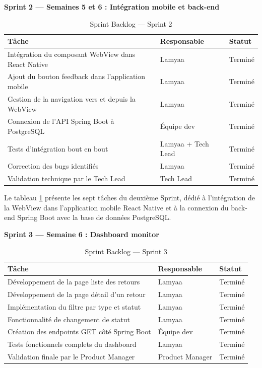 \textbf{Sprint 2 — Semaines 5 et 6 : Intégration mobile et back-end}

\begin{table}[H]
\centering
\caption{Sprint Backlog — Sprint 2}
\label{tab:sprint2}
\renewcommand{\arraystretch}{1.5}
\begin{tabular}{|p{7cm}|p{2.5cm}|p{2cm}|}
\hline
\textbf{Tâche} & \textbf{Responsable} & \textbf{Statut} \\
\hline
Intégration du composant WebView dans React Native & Lamyaa & Terminé \\
\hline
Ajout du bouton feedback dans l'application mobile & Lamyaa & Terminé \\
\hline
Gestion de la navigation vers et depuis la WebView & Lamyaa & Terminé \\
\hline
Connexion de l'API Spring Boot à PostgreSQL & Équipe dev & Terminé \\
\hline
Tests d'intégration bout en bout & Lamyaa + Tech Lead & Terminé \\
\hline
Correction des bugs identifiés & Lamyaa & Terminé \\
\hline
Validation technique par le Tech Lead & Tech Lead & Terminé \\
\hline
\end{tabular}
\end{table}

Le tableau \ref{tab:sprint2} présente les sept tâches du deuxième Sprint, 
dédié à l'intégration de la WebView dans l'application mobile React Native 
et à la connexion du back-end Spring Boot avec la base de données PostgreSQL.

\textbf{Sprint 3 — Semaine 6 : Dashboard monitor}

\begin{table}[H]
\centering
\caption{Sprint Backlog — Sprint 3}
\label{tab:sprint3}
\renewcommand{\arraystretch}{1.5}
\begin{tabular}{|p{7cm}|p{2.5cm}|p{2cm}|}
\hline
\textbf{Tâche} & \textbf{Responsable} & \textbf{Statut} \\
\hline
Développement de la page liste des retours & Lamyaa & Terminé \\
\hline
Développement de la page détail d'un retour & Lamyaa & Terminé \\
\hline
Implémentation du filtre par type et statut & Lamyaa & Terminé \\
\hline
Fonctionnalité de changement de statut & Lamyaa & Terminé \\
\hline
Création des endpoints GET côté Spring Boot & Équipe dev & Terminé \\
\hline
Tests fonctionnels complets du dashboard & Lamyaa & Terminé \\
\hline
Validation finale par le Product Manager & Product Manager & Terminé \\
\hline
\end{tabular}
\end{table}

